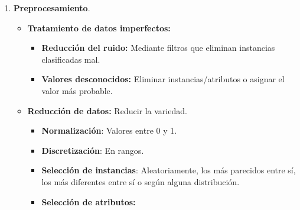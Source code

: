 \documentclass[12pt, twoside, openright]{report} %
\begin{document}
\begin{enumerate}
\def\labelenumi{\arabic{enumi}.}
\item
  \textbf{Preprocesamiento}.

  \begin{itemize}
  \item
    \textbf{Tratamiento de datos imperfectos:}

    \begin{itemize}
    
    \item
      \textbf{Reducción del ruido:} Mediante filtros que eliminan
      instancias clasificadas mal.
    \item
      \textbf{Valores desconocidos:} Eliminar instancias/atributos o
      asignar el valor más probable.
    \end{itemize}
  \item
    \textbf{Reducción de datos:} Reducir la variedad.

    \begin{itemize}
    \item
      \textbf{Normalización}: Valores entre 0 y 1.
    \item
      \textbf{Discretización}: En rangos.
    \item
      \textbf{Selección de instancias}: Aleatoriamente, los más
      parecidos entre sí, los más diferentes entre sí o según alguna
      distribución.
    \item
      \textbf{Selección de atributos:}


\end{itemize}
\end{itemize}
\end{enumerate}
\end{document}
